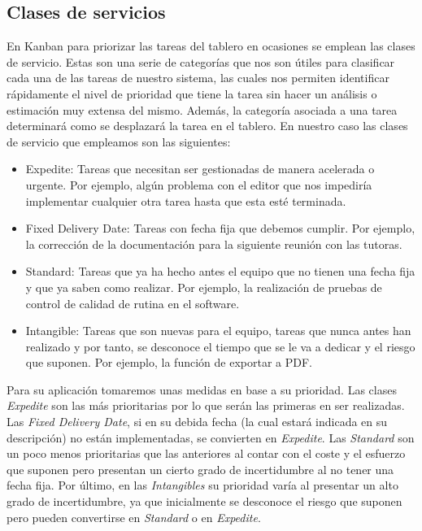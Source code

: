\subsection{Clases de servicios}
\label{claseDeServicio}
En Kanban para priorizar las tareas del tablero en ocasiones se emplean las clases de servicio. Estas son una serie de categorías que nos son útiles para clasificar cada una de las tareas de nuestro sistema, las cuales nos permiten identificar rápidamente el nivel de prioridad que tiene la tarea sin hacer un análisis o estimación muy extensa del mismo. Además, la categoría asociada a una tarea determinará como se desplazará la tarea en el tablero. En nuestro caso las clases de servicio que empleamos son las siguientes:
\begin{itemize}
    \item Expedite: Tareas que necesitan ser gestionadas de manera acelerada o urgente. Por ejemplo, algún problema con el editor que nos impediría implementar cualquier otra tarea hasta que esta esté terminada.
    \item Fixed Delivery Date: Tareas con fecha fija que debemos cumplir. Por ejemplo, la corrección de la documentación para la siguiente reunión con las tutoras.
    \item Standard: Tareas que ya ha hecho antes el equipo que no tienen una fecha fija y que ya saben como realizar. Por ejemplo, la realización de pruebas de control de calidad de rutina en el software.
    \item Intangible: Tareas que son nuevas para el equipo, tareas que nunca antes han realizado y por tanto, se desconoce el tiempo que se le va a dedicar y el riesgo que suponen. Por ejemplo, la función de exportar a PDF.
\end{itemize}

Para su aplicación tomaremos unas medidas en base a su prioridad. Las clases \textit{Expedite} son las más prioritarias por lo que serán las primeras en ser realizadas. Las \textit{Fixed Delivery Date}, si en su debida fecha (la cual estará indicada en su descripción) no están implementadas, se convierten en \textit{Expedite}. Las \textit{Standard} son un poco menos prioritarias que las anteriores al contar con el coste y el esfuerzo que suponen pero presentan un cierto grado de incertidumbre al no tener una fecha fija. Por último, en las \textit{Intangibles} su prioridad varía al presentar un alto grado de incertidumbre, ya que inicialmente se desconoce el riesgo que suponen pero pueden convertirse en \textit{Standard} o en \textit{Expedite}.

